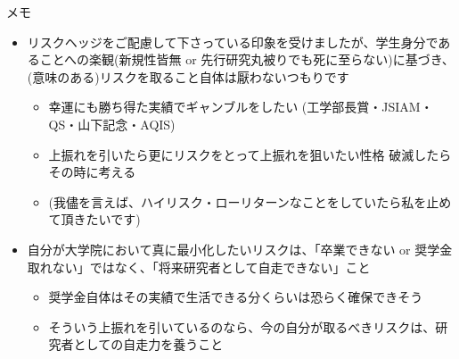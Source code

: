\documentclass[13pt,aspectratio=169,table,dvipdfmx]{beamer}
\newif\ifShowHidden
\begin{document}
    \begin{frame}{\LARGE{メモ}}
        \begin{itemize}
            \item リスクヘッジをご配慮して下さっている印象を受けましたが、学生身分であることへの楽観(新規性皆無 or 先行研究丸被りでも死に至らない)に基づき、(意味のある)リスクを取ること自体は厭わないつもりです
                  \begin{itemize}
                      \item 幸運にも勝ち得た実績でギャンブルをしたい (工学部長賞・JSIAM・QS・山下記念・AQIS)
                      \item 上振れを引いたら更にリスクをとって上振れを狙いたい性格 破滅したらその時に考える
                      \item (我儘を言えば、ハイリスク・ローリターンなことをしていたら私を止めて頂きたいです)
                  \end{itemize}
            \item 自分が大学院において真に最小化したいリスクは、「卒業できない or 奨学金取れない」ではなく、「将来研究者として自走できない」こと
                  \begin{itemize}
                      \item 奨学金自体はその実績で生活できる分くらいは恐らく確保できそう
                      \item そういう上振れを引いているのなら、今の自分が取るべきリスクは、研究者としての自走力を養うこと
                  \end{itemize}
        \end{itemize}
    \end{frame}
\fi

\ifShowHidden
    \begin{frame}[allowframebreaks]{Reference}
        \scriptsize
        \beamertemplatetextbibitems
        
        
    \end{frame}
\fi
\end{document}
